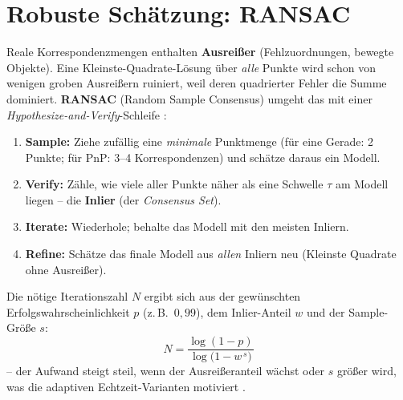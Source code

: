 \section{Robuste Schätzung: RANSAC}
\label{sec:ransac}
Reale Korrespondenzmengen enthalten \textbf{Ausreißer} (Fehlzuordnungen,
bewegte Objekte). Eine Kleinste-Quadrate-Lösung über \emph{alle} Punkte wird
schon von wenigen groben Ausreißern ruiniert, weil deren quadrierter Fehler die
Summe dominiert. \textbf{RANSAC} (Random Sample Consensus) umgeht das mit einer
\emph{Hypothesize-and-Verify}-Schleife \cite{raguram2008ransac}:
\begin{enumerate}
\item \textbf{Sample:} Ziehe zufällig eine \emph{minimale} Punktmenge (für eine
  Gerade: 2 Punkte; für PnP: 3--4 Korrespondenzen) und schätze daraus ein
  Modell.
\item \textbf{Verify:} Zähle, wie viele aller Punkte näher als eine Schwelle
  $\tau$ am Modell liegen -- die \textbf{Inlier} (der \emph{Consensus Set}).
\item \textbf{Iterate:} Wiederhole; behalte das Modell mit den meisten Inliern.
\item \textbf{Refine:} Schätze das finale Modell aus \emph{allen} Inliern neu
  (Kleinste Quadrate ohne Ausreißer).
\end{enumerate}
Die nötige Iterationszahl $N$ ergibt sich aus der gewünschten Erfolgs\-wahr\-schein\-lich\-keit
$p$ (z.\,B.\ $0{,}99$), dem Inlier-Anteil $w$ und der Sample-Größe $s$:
\begin{equation}
N = \frac{\log(1-p)}{\log\!\big(1-w^{\,s}\big)}
\end{equation}
-- der Aufwand steigt steil, wenn der Ausreißeranteil wächst oder $s$ größer
wird, was die adaptiven Echtzeit-Varianten motiviert \cite{raguram2008ransac}.

